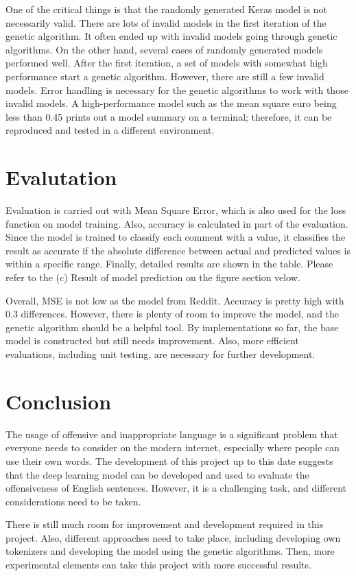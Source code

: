 \documentclass[11pt, natbib=false]{article}
\begin{document}
\begin{multicols}{2}
One of the critical things is that the randomly generated Keras model is not necessarily valid.
There are lots of invalid models in the first iteration of the genetic algorithm.
It often ended up with invalid models going through genetic algorithms. On the other hand, several cases of randomly generated models performed well.
After the first iteration, a set of models with somewhat high performance start a genetic algorithm.
However, there are still a few invalid models.
Error handling is necessary for the genetic algorithms to work with those invalid models.
A high-performance model such as the mean square euro being less than 0.45 prints out a model summary on a terminal; therefore, it can be reproduced and tested in a different environment.


\section{Evalutation}
Evaluation is carried out with Mean Square Error, which is also used for the loss function on model training.
Also, accuracy is calculated in part of the evaluation.
Since the model is trained to classify each comment with a value, it classifies the result as accurate if the absolute difference between actual and predicted values is within a specific range. Finally, detailed results are shown in the table. Please refer to the (c) Result of model prediction on the figure section velow.

Overall, MSE is not low as the model from Reddit.
Accuracy is pretty high with 0.3 differences.
However, there is plenty of room to improve the model, and the genetic algorithm should be a helpful tool. By implementations so far, the base model is constructed but still needs improvement.
Also, more efficient evaluations, including unit testing, are necessary for further development.


\section{Conclusion}
The usage of offensive and inappropriate language is a significant problem that everyone needs to consider on the modern internet, especially where people can use their own words.
The development of this project up to this date suggests that the deep learning model can be developed and used to evaluate the offensiveness of English sentences.
However, it is a challenging task, and different considerations need to be taken.

There is still much room for improvement and development required in this project.
Also, different approaches need to take place, including developing own tokenizers and developing the model using the genetic algorithms.
Then, more experimental elements can take this project with more successful results.

\newpage
\printbibliography
\end{multicols}
\newpage
\end{document}
